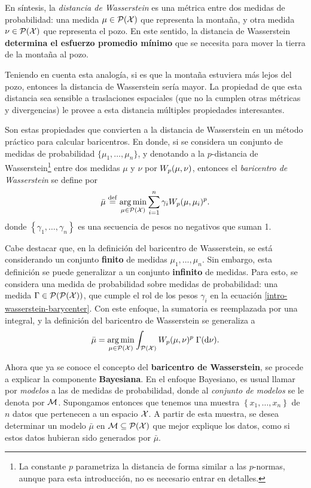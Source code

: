 En síntesis, la \emph{distancia de Wasserstein} es una métrica entre dos medidas de probabilidad: una medida $\mu\in \ProbSpace[\cX]$ que representa la montaña, y otra medida $\nu\in \ProbSpace[\cX]$ que representa el pozo. En este sentido, la distancia de Wasserstein \textbf{determina el esfuerzo promedio mínimo} que se necesita para mover la tierra de la montaña al pozo.

Teniendo en cuenta esta analogía, si es que la montaña estuviera más lejos del pozo, entonces la distancia de Wasserstein sería mayor. La propiedad de que esta distancia sea sensible a traslaciones espaciales (que no la cumplen otras métricas y divergencias) le provee a esta distancia múltiples propiedades interesantes.

Son estas propiedades que convierten a la distancia de Wasserstein en un método práctico para calcular baricentros. En donde, si se considera un conjunto de medidas de probabilidad $\{\mu_1, \ldots, \mu_n\}$, y denotando a la $p$-distancia de Wasserstein\footnote{La constante $p$ parametriza la distancia de forma similar a las $p$-normas, aunque para esta introducción, no es necesario entrar en detalles.} entre dos medidas $\mu$ y $\nu$ por $\Wasserstein[p]{\mu}{\nu}$, entonces el \emph{baricentro de Wasserstein} se define por
\begin{equation}\label{intro-wasserstein-barycenter}
	\bar\mu \eqdef \argmin_{\mu \in \ProbSpace[\cX]} \sum_{i=1}^n \gamma_i \Wasserstein[p]{\mu}{\mu_i}^p.
\end{equation}
donde $\left\{ \gamma_1, \ldots, \gamma_n \right\}$ es una secuencia de pesos no negativos que suman 1.

Cabe destacar que, en la definición del baricentro de Wasserstein, se está considerando un conjunto \textbf{finito} de medidas $\mu_1, \ldots, \mu_n$. Sin embargo, esta definición se puede generalizar a un conjunto \textbf{infinito} de medidas. Para esto, se considera una medida de probabilidad sobre medidas de probabilidad: una medida $\Gamma \in \ProbSpace[\ProbSpace[\cX]]$, que cumple el rol de los pesos $\gamma_i$ en la ecuación \eqref{intro-wasserstein-barycenter}. Con este enfoque, la sumatoria es reemplazada por una integral, y la definición del baricentro de Wasserstein se generaliza a
\begin{equation}
	\bar\mu = \argmin_{\mu \in \ProbSpace[\cX]} \int_{\ProbSpace[\cX]} \Wasserstein[p]{\mu}{\nu}^p \; {\Gamma(\dd \nu)}.
\end{equation}

Ahora que ya se conoce el concepto del \textbf{baricentro de Wasserstein}, se procede a explicar la componente \textbf{Bayesiana}. En el enfoque Bayesiano, es usual llamar por \emph{modelos} a las de medidas de probabilidad, donde al \emph{conjunto de modelos} se le denota por $\Models$.  Supongamos entonces que tenemos una muestra $\left\{ x_1, \ldots, x_n \right\}$ de $n$ datos que pertenecen a un espacio $\cX$.
A partir de esta muestra, se desea determinar un modelo $\bar{\mu}$ en $\Models\subseteq \ProbSpace[\cX]$ que mejor explique los datos, como si estos datos hubieran sido generados por $\bar{\mu}$.

